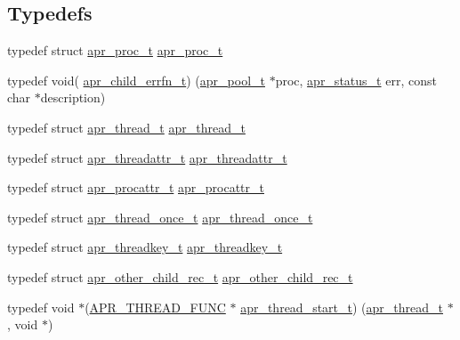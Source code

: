 \subsection*{Typedefs}
\begin{DoxyCompactItemize}
\item 
typedef struct \hyperlink{structapr__proc__t}{apr\+\_\+proc\+\_\+t} \hyperlink{group__apr__thread__proc_gada60ec0f833048291d98e66f21f4c4c4}{apr\+\_\+proc\+\_\+t}
\item 
typedef void( \hyperlink{group__apr__thread__proc_ga428aa21a05476068f95d9ee30d1b420a}{apr\+\_\+child\+\_\+errfn\+\_\+t}) (\hyperlink{group__apr__pools_gaf137f28edcf9a086cd6bc36c20d7cdfb}{apr\+\_\+pool\+\_\+t} $\ast$proc, \hyperlink{group__apr__errno_gaf76ee4543247e9fb3f3546203e590a6c}{apr\+\_\+status\+\_\+t} err, const char $\ast$description)
\item 
typedef struct \hyperlink{group__apr__thread__proc_ga646c71351e723d84f8cc8c8d1d5937be}{apr\+\_\+thread\+\_\+t} \hyperlink{group__apr__thread__proc_ga646c71351e723d84f8cc8c8d1d5937be}{apr\+\_\+thread\+\_\+t}
\item 
typedef struct \hyperlink{group__apr__thread__proc_ga35de571e9944871c10b38d8feef885ac}{apr\+\_\+threadattr\+\_\+t} \hyperlink{group__apr__thread__proc_ga35de571e9944871c10b38d8feef885ac}{apr\+\_\+threadattr\+\_\+t}
\item 
typedef struct \hyperlink{group__apr__thread__proc_ga0d83919a6a0dd609598a864917f8b339}{apr\+\_\+procattr\+\_\+t} \hyperlink{group__apr__thread__proc_ga0d83919a6a0dd609598a864917f8b339}{apr\+\_\+procattr\+\_\+t}
\item 
typedef struct \hyperlink{group__apr__thread__proc_ga91841bcf20d0579e8e6acc6d3c220ac1}{apr\+\_\+thread\+\_\+once\+\_\+t} \hyperlink{group__apr__thread__proc_ga91841bcf20d0579e8e6acc6d3c220ac1}{apr\+\_\+thread\+\_\+once\+\_\+t}
\item 
typedef struct \hyperlink{group__apr__thread__proc_ga337c9c1bd2d47740022071a5c41f2edb}{apr\+\_\+threadkey\+\_\+t} \hyperlink{group__apr__thread__proc_ga337c9c1bd2d47740022071a5c41f2edb}{apr\+\_\+threadkey\+\_\+t}
\item 
typedef struct \hyperlink{group__apr__thread__proc_gafc52ee8b19a7b222278d31ebb3f11a71}{apr\+\_\+other\+\_\+child\+\_\+rec\+\_\+t} \hyperlink{group__apr__thread__proc_gafc52ee8b19a7b222278d31ebb3f11a71}{apr\+\_\+other\+\_\+child\+\_\+rec\+\_\+t}
\item 
typedef void $\ast$(\hyperlink{group__apr__platform_gade8f829f9bd98fd4386894acf72edd7c}{A\+P\+R\+\_\+\+T\+H\+R\+E\+A\+D\+\_\+\+F\+U\+NC} $\ast$ \hyperlink{group__apr__thread__proc_gaa1f88d2a6fe971ac200e466cae5f63e0}{apr\+\_\+thread\+\_\+start\+\_\+t}) (\hyperlink{group__apr__thread__proc_ga646c71351e723d84f8cc8c8d1d5937be}{apr\+\_\+thread\+\_\+t} $\ast$, void $\ast$)
\end{DoxyCompactItemize}
